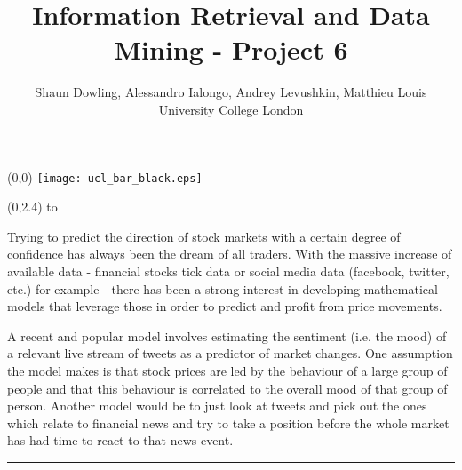 \documentclass[a0]{a0poster}
\title{Information Retrieval and Data Mining - Project 6}
\author{Shaun Dowling, Alessandro Ialongo, Andrey Levushkin, Matthieu Louis\\ University College London}
\def\Head#1{\noindent\hbox to \hsize{\hfil{\LARGE\color{DarkBlue}\sf #1}}\bigskip}
\begin{document}
\begin{textblock}{23}(0,0)
\vspace*{-48mm}\hspace*{-42mm}%
\texttt{[image: ucl\_bar\_black.eps]}
\begin{minipage}{1191mm}		%
\vspace{-20cm}
\maketitle
\end{minipage}
\end{textblock}


\begin{textblock}{7}(0,2.4)
\Head{Introductory segment}

\sf %
Trying to predict the direction of stock markets with a certain degree of confidence has always been the dream of all traders. With the massive increase of available data - financial stocks tick data or social media data (facebook, twitter, etc.) for example - there has been a strong interest in developing mathematical models that leverage those in order to predict and profit from price movements.

A recent and popular model involves estimating the sentiment (i.e. the mood) of a relevant live stream of tweets as a predictor of market changes. One assumption the model makes is that stock prices are led by the behaviour of a large group of people and that this behaviour is correlated to the overall mood of that group of person. Another model would be to just look at tweets and pick out the ones which relate to financial news and try to take a position before the whole market has had time to react to that news event.


\bigskip
\hrule
\end{textblock}
\end{document}
